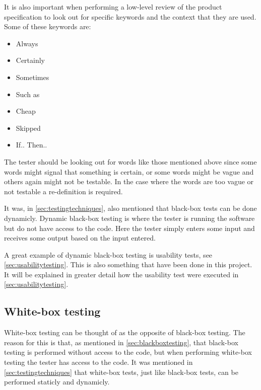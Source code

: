 It is also important when performing a low-level review of the product specification to look out for specific keywords and the context that they are used.
Some of these keywords are:
\begin{multicols}{2}
\begin{itemize}
	\item Always
	\item Certainly
	\item Sometimes
	\item Such as
	\item Cheap
	\item Skipped
	\item If.. Then..
\end{itemize}
\end{multicols}

The tester should be looking out for words like those mentioned above since some words might signal that something is certain, or some words might be vague and others again might not be testable.
In the case where the words are too vague or not testable a re-definition is required. \cite{SoftwareTesting}

It was, in \cref{sec:testingtechniques}, also mentioned that black-box tests can be done dynamicly.
Dynamic black-box testing is where the tester is running the software but do not have access to the code. %
Here the tester simply enters some input and receives some output based on the input entered. \cite{SoftwareTesting}

A great example of dynamic black-box testing is usability tests, see \cref{sec:usabilitytesting}.
This is also something that have been done in this project.
It will be explained in greater detail how the usability test were executed in \cref{sec:usabilitytesting}.

\subsection{White-box testing} \label{sec:whiteboxtesting}
White-box testing can be thought of as the opposite of black-box testing.
The reason for this is that, as mentioned in \cref{sec:blackboxtesting}, that black-box testing is performed without access to the code, but when performing white-box testing the tester has access to the code.
It was mentioned in \cref{sec:testingtechniques} that white-box tests, just like black-box tests, can be performed staticly and dynamicly.

